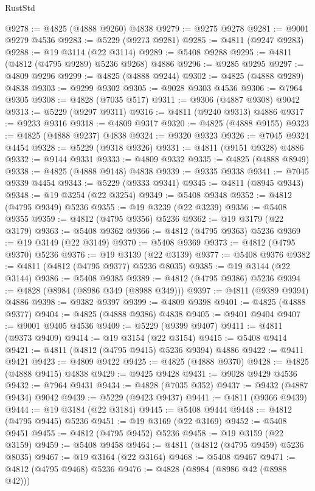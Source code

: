 \begin{lexlean}{RustStd}
\begin{coremodule}
{\begin{coremodule}
{{{{{{{{{{{{{{{{{{{{{{{{{{{{{{{{{{{{{{{{{{{{{{{{{{{{{{{{{{{{{{{{{{{{{{{{{{{{{{{{@9278 := @4825 (@4888 @9260) @4838
@9279 := @9275 @9278
@9281 := @9001 @9279 @4536
@9283 := @5229 (@9273 @9281)
@9285 := @4811 (@9247 @9283)
@9288 := @19 @3114 (@22 @3114)
@9289 := @5408 @9288
@9295 := @4811 (@4812 (@4795 @9289) @5236 @9268) @4886
@9296 := @9285 @9295
@9297 := @4809 @9296
@9299 := @4825 (@4888 @9244)
@9302 := @4825 (@4888 @9289) @4838
@9303 := @9299 @9302
@9305 := @9028 @9303 @4536
@9306 := @7964 @9305
@9308 := @4828 (@7035 @517)
@9311 := @9306 (@4887 @9308) @9042
@9313 := @5229 (@9297 @9311)
@9316 := @4811 (@9240 @9313) @4886
@9317 := @9233 @9316
@9318 := @4809 @9317
@9320 := @4825 (@4888 @9155)
@9323 := @4825 (@4888 @9237) @4838
@9324 := @9320 @9323
@9326 := @7045 @9324 @4454
@9328 := @5229 (@9318 @9326)
@9331 := @4811 (@9151 @9328) @4886
@9332 := @9144 @9331
@9333 := @4809 @9332
@9335 := @4825 (@4888 @8949)
@9338 := @4825 (@4888 @9148) @4838
@9339 := @9335 @9338
@9341 := @7045 @9339 @4454
@9343 := @5229 (@9333 @9341)
@9345 := @4811 (@8945 @9343)
@9348 := @19 @3254 (@22 @3254)
@9349 := @5408 @9348
@9352 := @4812 (@4795 @9349) @5236
@9355 := @19 @3239 (@22 @3239)
@9356 := @5408 @9355
@9359 := @4812 (@4795 @9356) @5236
@9362 := @19 @3179 (@22 @3179)
@9363 := @5408 @9362
@9366 := @4812 (@4795 @9363) @5236
@9369 := @19 @3149 (@22 @3149)
@9370 := @5408 @9369
@9373 := @4812 (@4795 @9370) @5236
@9376 := @19 @3139 (@22 @3139)
@9377 := @5408 @9376
@9382 := @4811 (@4812 (@4795 @9377) @5236 @8035)
@9385 := @19 @3144 (@22 @3144)
@9386 := @5408 @9385
@9389 := @4812 (@4795 @9386) @5236
@9394 := @4828 (@8984 (@8986 @349 (@8988 @349)))
@9397 := @4811 (@9389 @9394) @4886
@9398 := @9382 @9397
@9399 := @4809 @9398
@9401 := @4825 (@4888 @9377)
@9404 := @4825 (@4888 @9386) @4838
@9405 := @9401 @9404
@9407 := @9001 @9405 @4536
@9409 := @5229 (@9399 @9407)
@9411 := @4811 (@9373 @9409)
@9414 := @19 @3154 (@22 @3154)
@9415 := @5408 @9414
@9421 := @4811 (@4812 (@4795 @9415) @5236 @9394) @4886
@9422 := @9411 @9421
@9423 := @4809 @9422
@9425 := @4825 (@4888 @9370)
@9428 := @4825 (@4888 @9415) @4838
@9429 := @9425 @9428
@9431 := @9028 @9429 @4536
@9432 := @7964 @9431
@9434 := @4828 (@7035 @352)
@9437 := @9432 (@4887 @9434) @9042
@9439 := @5229 (@9423 @9437)
@9441 := @4811 (@9366 @9439)
@9444 := @19 @3184 (@22 @3184)
@9445 := @5408 @9444
@9448 := @4812 (@4795 @9445) @5236
@9451 := @19 @3169 (@22 @3169)
@9452 := @5408 @9451
@9455 := @4812 (@4795 @9452) @5236
@9458 := @19 @3159 (@22 @3159)
@9459 := @5408 @9458
@9464 := @4811 (@4812 (@4795 @9459) @5236 @8035)
@9467 := @19 @3164 (@22 @3164)
@9468 := @5408 @9467
@9471 := @4812 (@4795 @9468) @5236
@9476 := @4828 (@8984 (@8986 @42 (@8988 @42)))
}}}}}}}}}}}}}}}}}}}}}}}}}}}}}}}}}}}}}}}}}}}}}}}}}}}}}}}}}}}}}}}}}}}}}}}}}}}}}}}}
\end{coremodule}}
\end{coremodule}
\end{lexlean}
